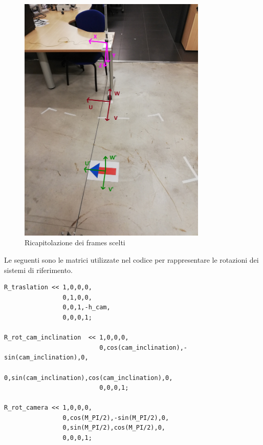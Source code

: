 \begin{figure}[H]
	\centering
	\includegraphics[width=0.8\textwidth]{Immagini/camera_opposite_pov.jpg}
	\caption{Ricapitolazione dei frames scelti}
	\label{fig:all_frames}
\end{figure}

Le seguenti sono le matrici utilizzate nel codice per rappresentare le rotazioni dei sistemi di riferimento.
\begin{lstlisting}
R_traslation << 1,0,0,0,
				0,1,0,0,
				0,0,1,-h_cam,
				0,0,0,1;

R_rot_cam_inclination  << 1,0,0,0,
					      0,cos(cam_inclination),-sin(cam_inclination),0,
						  0,sin(cam_inclination),cos(cam_inclination),0,
						  0,0,0,1;

R_rot_camera << 1,0,0,0,
				0,cos(M_PI/2),-sin(M_PI/2),0,
				0,sin(M_PI/2),cos(M_PI/2),0,
				0,0,0,1;
\end{lstlisting}